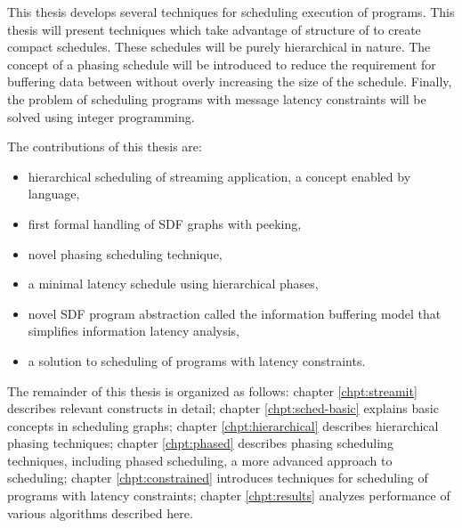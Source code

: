 This thesis develops several techniques for scheduling execution
of {\StreamIt} programs. This thesis will present techniques which
take advantage of structure of {\StreamIt} to create compact
schedules. These schedules will be purely hierarchical in nature.
The concept of a phasing schedule will be introduced to reduce the
requirement for buffering data between {\filters} without overly
increasing the size of the schedule. Finally, the problem of
scheduling programs with message latency constraints will be
solved using integer programming.

The contributions of this thesis are:
\begin{itemize} \item
hierarchical scheduling of streaming application, a concept
enabled by {\StreamIt} language, \item first formal handling of
SDF graphs with peeking, \item novel phasing scheduling technique,
\item a minimal latency schedule using hierarchical phases, \item
novel SDF program abstraction called the information buffering
model that simplifies information latency analysis, \item a
solution to scheduling of {\StreamIt} programs with latency
constraints.
\end{itemize}

The remainder of this thesis is organized as follows: chapter
\ref{chpt:streamit} describes relevant {\StreamIt} constructs in
detail; chapter \ref{chpt:sched-basic} explains basic concepts in
scheduling {\StreamIt} graphs; chapter \ref{chpt:hierarchical}
describes hierarchical phasing techniques; chapter
\ref{chpt:phased} describes phasing scheduling techniques,
including phased scheduling, a more advanced approach to
scheduling; chapter \ref{chpt:constrained} introduces techniques
for scheduling of {\StreamIt} programs with latency constraints;
chapter \ref{chpt:results} analyzes performance of various
algorithms described here.

